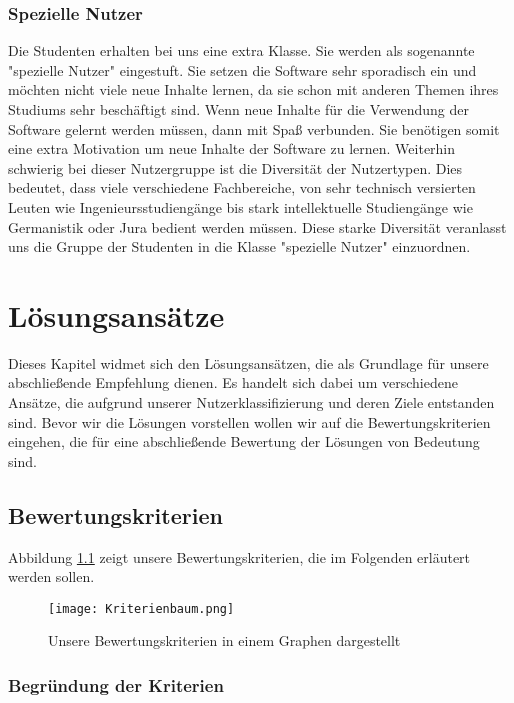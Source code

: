 \subsection{Spezielle Nutzer}
Die Studenten erhalten bei uns eine extra Klasse. Sie werden als sogenannte "spezielle Nutzer" eingestuft. Sie setzen die Software sehr sporadisch ein und möchten nicht viele neue Inhalte lernen, da sie schon mit anderen Themen ihres Studiums sehr beschäftigt sind. Wenn neue Inhalte für die Verwendung der Software gelernt werden müssen, dann mit Spaß verbunden. Sie benötigen somit eine extra Motivation um neue Inhalte der Software zu lernen. Weiterhin schwierig bei dieser Nutzergruppe ist die Diversität der Nutzertypen. Dies bedeutet, dass viele verschiedene Fachbereiche, von sehr technisch versierten Leuten wie Ingenieursstudiengänge bis stark intellektuelle Studiengänge wie Germanistik oder Jura bedient werden müssen. Diese starke Diversität veranlasst uns die Gruppe der Studenten in die Klasse "spezielle Nutzer" einzuordnen.



\chapter{Lösungsansätze}
Dieses Kapitel widmet sich den Lösungsansätzen, die als Grundlage für unsere abschließende Empfehlung dienen. Es handelt sich dabei um verschiedene Ansätze, die aufgrund unserer Nutzerklassifizierung und deren Ziele entstanden sind. Bevor wir die Lösungen vorstellen wollen wir auf die Bewertungskriterien eingehen, die für eine abschließende Bewertung der Lösungen von Bedeutung sind.
\section{Bewertungskriterien}
Abbildung \ref{img1:criteria} zeigt unsere Bewertungskriterien, die im Folgenden erläutert werden sollen.
\begin{figure}[ht]
\begin{center}
\texttt{[image: Kriterienbaum.png]}
\caption{Unsere Bewertungskriterien in einem Graphen dargestellt}
\label{img1:criteria}
\end{center}
\end{figure} 

\subsection{Begründung der Kriterien}
